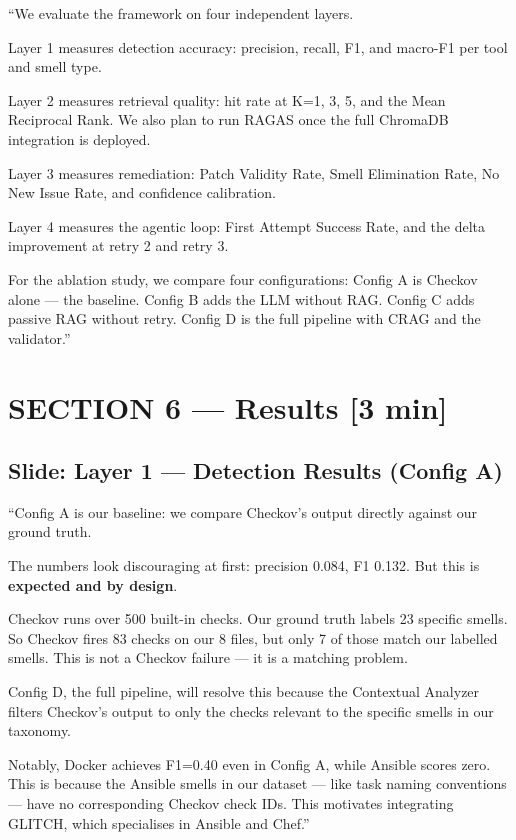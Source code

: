 \documentclass[12pt,a4paper]{article}
\newcommand{\timing}[1]{{\color{slidegold}\textbf{[#1]}}}
\begin{document}
\begin{saybox}
``We evaluate the framework on four independent layers.

Layer 1 measures detection accuracy: precision, recall, F1, and macro-F1 per tool and smell type.

Layer 2 measures retrieval quality: hit rate at K=1, 3, 5, and the Mean Reciprocal Rank.
We also plan to run RAGAS once the full ChromaDB integration is deployed.

Layer 3 measures remediation: Patch Validity Rate, Smell Elimination Rate,
No New Issue Rate, and confidence calibration.

Layer 4 measures the agentic loop: First Attempt Success Rate,
and the delta improvement at retry 2 and retry 3.

For the ablation study, we compare four configurations:
Config A is Checkov alone --- the baseline.
Config B adds the LLM without RAG.
Config C adds passive RAG without retry.
Config D is the full pipeline with CRAG and the validator.''
\end{saybox}

\section{SECTION 6 --- Results \timing{3 min}}

\subsection{Slide: Layer 1 --- Detection Results (Config A)}

\begin{saybox}
``Config A is our baseline: we compare Checkov's output directly against our ground truth.

The numbers look discouraging at first: precision 0.084, F1 0.132.
But this is \textbf{expected and by design}.

Checkov runs over 500 built-in checks. Our ground truth labels 23 specific smells.
So Checkov fires 83 checks on our 8 files, but only 7 of those match our labelled smells.
This is not a Checkov failure --- it is a matching problem.

Config D, the full pipeline, will resolve this because the Contextual Analyzer filters
Checkov's output to only the checks relevant to the specific smells in our taxonomy.

Notably, Docker achieves F1=0.40 even in Config A, while Ansible scores zero.
This is because the Ansible smells in our dataset --- like task naming conventions ---
have no corresponding Checkov check IDs. This motivates integrating GLITCH,
which specialises in Ansible and Chef.''
\end{saybox}
\end{document}

